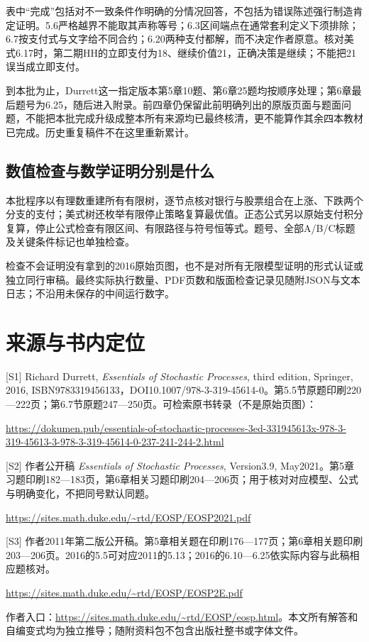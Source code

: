 \documentclass[11pt,a4paper,UTF8,fontset=fandol]{ctexart}
\begin{document}
表中``完成''包括对不一致条件作明确的分情况回答，不包括为错误陈述强行制造肯定证明。5.6严格越界不能取其声称等号；6.3区间端点在通常套利定义下须排除；6.7按支付式与文字给不同合约；6.20两种支付都解，而不决定作者原意。核对美式6.17时，第二期HH的立即支付为18、继续价值21，正确决策是继续；不能把21误当成立即支付。

到本批为止，Durrett这一指定版本第5章10题、第6章25题均按顺序处理；第6章最后题号为6.25，随后进入附录。前四章仍保留此前明确列出的原版页面与题面问题，不能把本批完成升级成整本所有来源均已最终核清，更不能算作其余四本教材已完成。历史重复稿件不在这里重新累计。

\subsection{数值检查与数学证明分别是什么}\label{ux6570ux503cux68c0ux67e5ux4e0eux6570ux5b66ux8bc1ux660eux5206ux522bux662fux4ec0ux4e48}

本批程序以有理数重建所有有限树，逐节点核对银行与股票组合在上涨、下跌两个分支的支付；美式树还枚举有限停止策略复算最优值。正态公式另以原始支付积分复算，停止公式检查有限区间、有限路径与符号恒等式。题号、全部A/B/C标题及关键条件标记也单独检查。

检查不会证明没有拿到的2016原始页图，也不是对所有无限模型证明的形式认证或独立同行审稿。最终实际执行数量、PDF页数和版面检查记录见随附JSON与文本日志；不沿用未保存的中间运行数字。

\section{来源与书内定位}\label{ux6765ux6e90ux4e0eux4e66ux5185ux5b9aux4f4d}

{[}S1{]} Richard Durrett, \emph{Essentials of Stochastic Processes},
third edition, Springer, 2016,
ISBN9783319456133，DOI10.1007/978-3-319-45614-0。第5.5节原题印刷220---222页；第6.7节原题247---250页。可检索原书转录（不是原始页图）：

\url{https://dokumen.pub/essentials-of-stochastic-processes-3ed-331945613x-978-3-319-45613-3-978-3-319-45614-0-237-241-244-2.html}

{[}S2{]} 作者公开稿 \emph{Essentials of Stochastic Processes},
Version3.9,
May2021。第5章习题印刷182---183页，第6章相关习题印刷204---206页；用于核对对应模型、公式与明确变化，不把同号默认同题。

\url{https://sites.math.duke.edu/~rtd/EOSP/EOSP2021.pdf}

{[}S3{]}
作者2011年第二版公开稿。第5章相关题在印刷176---177页；第6章相关题印刷203---206页。2016的5.5可对应2011的5.13；2016的6.10---6.25依实际内容与此稿相应题核对。

\url{https://sites.math.duke.edu/~rtd/EOSP/EOSP2E.pdf}

作者入口：\url{https://sites.math.duke.edu/~rtd/EOSP/eosp.html}。本文所有解答和自编变式均为独立推导；随附资料包不包含出版社整书或字体文件。
\end{document}
